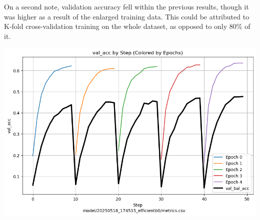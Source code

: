 \documentclass[10pt]{article}
\begin{document}
\vspace{1em}

\begin{minipage}{0.6\linewidth}
On a second note, validation accuracy fell within the previous results, though it was higher as a result of the enlarged training data. This could be attributed to K-fold cross-validation training on the whole dataset, as opposed to only 80\% of it.
\end{minipage}
\hfill
\begin{minipage}{0.35\linewidth}
  \includegraphics[width=\linewidth]{img/efficientb_acc_kfold.png}
\end{minipage}
\end{document}
